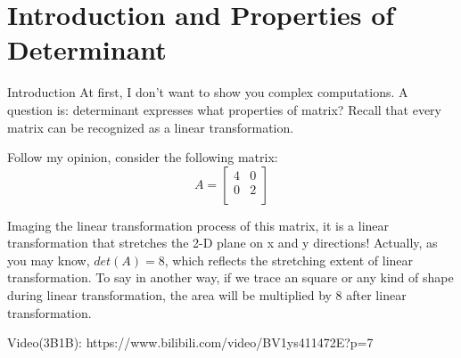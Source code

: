 \documentclass{beamer}
\begin{document}
\section{Introduction and Properties of Determinant}
\begin{frame}{Introduction}
At first, I don't want to show you complex computations. A question is: determinant expresses what properties of matrix? Recall that every matrix can be recognized as a linear transformation.

\vspace{3pt}
Follow my opinion, consider the following matrix:
\begin{equation*}
    A=\left[ \begin{matrix}
        4&		0\\
        0&		2\\
    \end{matrix} \right]
\end{equation*}

Imaging the linear transformation process of this matrix, it is a linear transformation that stretches the 2-D plane on x and y directions! Actually, as you may know, $det(A)=8$, which reflects the stretching extent of linear transformation. To say in another way, if we trace an square or any kind of shape during linear transformation, the area will be multiplied by 8 after linear transformation.

\vspace{3pt}
Video(3B1B): https://www.bilibili.com/video/BV1ys411472E?p=7

\end{frame}
\end{document}
